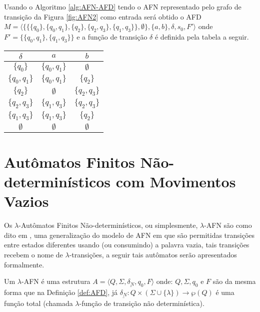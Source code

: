 \begin{example}\label{exe:ConvertendoAFN-AFD2}
	Usando o Algoritmo \ref{alg:AFN-AFD}  tendo o AFN representado pelo grafo de transição da Figura \ref{fig:AFN2} como entrada será obtido o AFD $M = \langle \{ \{\{q_0\}, \{q_0, q_1\}, \{q_2\}, \{q_2, q_3\},  \{q_1, q_3\} \}, \emptyset\}, \{a,b\}, \delta, s_0, F'\rangle$ onde  $F' = \{\{q_0, q_1\}, \{q_1, q_3\}\}$ e a função de transição $\delta$ é definida pela tabela a seguir. 
	
	\begin{table*}[h]
		\centering
		\begin{tabular}{c|cc}
			$\delta$	& $a$ & $b$\\ \hline
			$\{q_0\}$		& $\{q_0, q_1\}$ & $\emptyset$ \\
			$\{q_0, q_1\}$		& $\{q_0, q_1\}$  & $\{q_2\}$ \\
			$\{q_2\}$		& $\emptyset$  & $\{q_2, q_3\}$ \\
			$\{q_2, q_3\}$		& $\{q_1, q_3\}$ & $\{q_2, q_3\}$ \\
			$\{q_1, q_3\}$		& $\{q_1, q_3\}$& $\{q_2\}$ \\
			$\emptyset$		& $\emptyset$ & $\emptyset$ \\ \hline
		\end{tabular}
	\end{table*}
\end{example}

\section{Autômatos Finitos Não-determinísticos com Movimentos Vazios}\label{sec:LAFN}

Os $\lambda$-Autômatos Finitos Não-determinísticos, ou simplesmente, $\lambda$-AFN são como dito em \cite{menezes1998LFA}, uma generalização do modelo de AFN em que são permitidas transições entre estados diferentes usando (ou consumindo) a palavra vazia, tais transições recebem o nome de $\lambda$-transições, a seguir tais autômatos serão apresentados formalmente.

\begin{definition}\label{def:LAFN}
	Um $\lambda$-AFN é uma estrutura $A = \langle Q, \Sigma, \underline{\delta_N}, q_0, F\rangle$ onde: $Q, \Sigma, q_0$ e $F$ são da mesma forma que na Definição \ref{def:AFD}, já $\underline{\delta_N} : Q \times (\Sigma \cup \{\lambda\}) \rightarrow \wp(Q)$ é uma função total (chamada $\lambda$-função de transição não determinística).
\end{definition}

